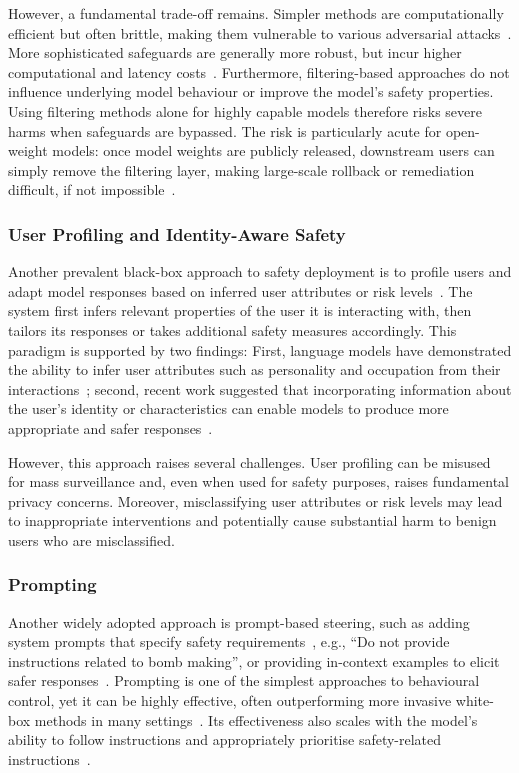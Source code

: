 However, a fundamental trade-off remains. Simpler methods are computationally efficient but often brittle, making them vulnerable to various adversarial attacks~. More sophisticated safeguards are generally more robust, but incur higher computational and latency costs~. Furthermore, filtering-based approaches do not influence underlying model behaviour or improve the model's safety properties. Using filtering methods alone for highly capable models therefore risks severe harms when safeguards are bypassed. The risk is particularly acute for open-weight models: once model weights are publicly released, downstream users can simply remove the filtering layer, making large-scale rollback or remediation difficult, if not impossible~.

\subsubsection*{User Profiling and Identity-Aware Safety}
Another prevalent black-box approach to safety deployment is to profile users and adapt model responses based on inferred user attributes or risk levels~. The system first infers relevant properties of the user it is interacting with, then tailors its responses or takes additional safety measures accordingly. This paradigm is supported by two findings: First, language models have demonstrated the ability to infer user attributes such as personality and occupation from their interactions~; second, recent work suggested that incorporating information about the user's identity or characteristics can enable models to produce more appropriate and safer responses~.

However, this approach raises several challenges. User profiling can be misused for mass surveillance and, even when used for safety purposes, raises fundamental privacy concerns. Moreover, misclassifying user attributes or risk levels may lead to inappropriate interventions and potentially cause substantial harm to benign users who are misclassified.



\subsubsection*{Prompting}
Another widely adopted approach is prompt-based steering, such as adding system prompts that specify safety requirements~, e.g., ``Do not provide instructions related to bomb making'', or providing in-context examples to elicit safer responses~. Prompting is one of the simplest approaches to behavioural control, yet it can be highly effective, often outperforming more invasive white-box methods in many settings~. Its effectiveness also scales with the model's ability to follow instructions and appropriately prioritise safety-related instructions~.

